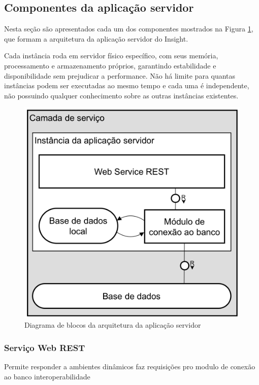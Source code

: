\documentclass[english,brazilian]{UNISINOSmonografia}
\begin{document}
\subsection{Componentes da aplicação servidor}\label{componentesAplicacaoServidor}
Nesta seção são apresentados cada um dos componentes mostrados na Figura \ref{fig:arquiteturaInstancia}, que formam a arquitetura da aplicação servidor do Insight.

Cada instância roda em servidor físico específico, com seus memória, processamento e armazenamento próprios, garantindo estabilidade e disponibilidade sem prejudicar a performance. Não há limite para quantas instâncias podem ser executadas ao mesmo tempo e cada uma é independente, não possuindo qualquer conhecimento sobre as outras instâncias existentes.

\begin{figure}[!ht]
	\caption{Diagrama de blocos da arquitetura da aplicação servidor}
	\label{fig:arquiteturaInstancia}
	\centering%
	\begin{minipage}{.5\textwidth}
		\includegraphics[width=\textwidth]{imgs/arquiteturaInstancia.png}
	\end{minipage}
\end{figure}

\subsubsection{Serviço Web REST}
Permite responder a ambientes dinâmicos
faz requisições pro modulo de conexão ao banco
interoperabilidade
\end{document}
